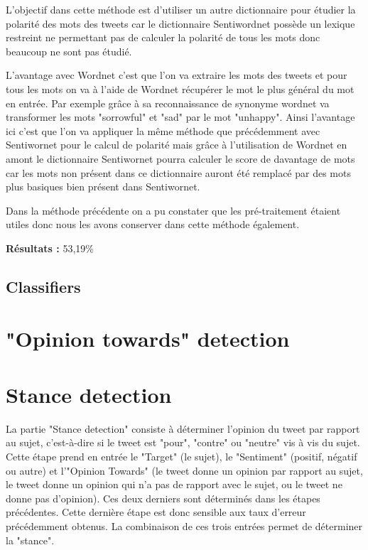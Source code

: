 \par L'objectif dans cette méthode est d'utiliser un autre dictionnaire pour étudier la polarité des mots des tweets car le dictionnaire Sentiwordnet possède un lexique restreint ne permettant pas de calculer la polarité de tous les mots donc beaucoup ne sont pas étudié. \\

\par L'avantage avec Wordnet c'est que l'on va extraire les mots des tweets et pour tous les mots on va à l'aide de Wordnet récupérer le mot le plus général du mot en entrée. Par exemple grâce à sa reconnaissance de synonyme wordnet va transformer les mots "sorrowful" et "sad" par le mot "unhappy". Ainsi l'avantage ici c'est que l'on va appliquer la même méthode que précédemment avec Sentiwornet pour le calcul de polarité mais grâce à l'utilisation de Wordnet en amont le dictionnaire Sentiwornet pourra calculer le score de davantage de mots car les mots non présent dans ce dictionnaire auront été remplacé par des mots plus basiques bien présent dans Sentiwornet. \\ 

\par Dans la méthode précédente on a pu constater que les pré-traitement étaient utiles donc nous les avons conserver dans cette méthode également. \\

\par\textbf{ Résultats : } 53,19\%

\subsection{Classifiers}




\section{"Opinion towards" detection}

\section{Stance detection}

La partie "Stance detection" consiste à déterminer l'opinion du tweet par rapport au sujet, c'est-à-dire si le tweet est "pour", "contre" ou "neutre" vis à vis du sujet. Cette étape prend en entrée le "Target" (le sujet), le "Sentiment" (positif, négatif ou autre) et l'"Opinion Towards" (le tweet donne un opinion par rapport au sujet, le tweet donne un opinion qui n'a pas de rapport avec le sujet, ou le tweet ne donne pas d'opinion). Ces deux derniers sont déterminés dans les étapes précédentes. Cette dernière étape est donc sensible aux taux d'erreur précédemment obtenus.
La combinaison de ces trois entrées permet de déterminer la "stance". \\

